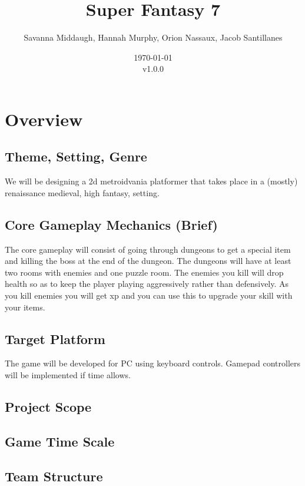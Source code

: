 \documentclass[titlepage]{article}
\title{Super Fantasy 7}
\author{Savanna Middaugh, Hannah Murphy, Orion Nassaux, Jacob Santillanes}
\date{\today\\v1.0.0}
\begin{document}
\maketitle
\section{Overview}

\subsection*{Theme, Setting, Genre}
We will be designing a 2d metroidvania platformer that takes place in a (mostly) renaissance medieval, high fantasy, setting. 

\subsection*{Core Gameplay Mechanics (Brief)}
The core gameplay will consist of going through dungeons to get a special item and killing the boss at the end of the dungeon. The dungeons will have at least two rooms with enemies and one puzzle room. The enemies you kill will drop health so as to keep the player playing aggressively rather than defensively. As you kill enemies you will get xp and you can use this to upgrade your skill with your items. 

\subsection*{Target Platform}
The game will be developed for PC using keyboard controls. Gamepad controllers will be implemented if time allows.

\subsection*{Project Scope}

\subsection*{Game Time Scale}

\subsection*{Team Structure}
\end{document}
